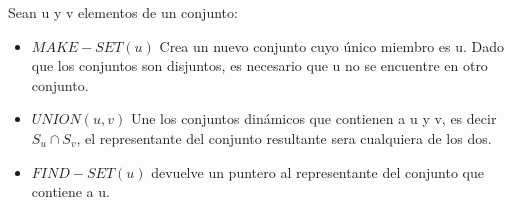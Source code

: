 \noindent Sean u y v elementos de un conjunto:
\begin{itemize}
    \item $MAKE-SET(u)$ Crea un nuevo conjunto cuyo único miembro es u. Dado que los conjuntos son disjuntos, es necesario que u no se encuentre en otro conjunto.
    \item $UNION(u, v)$ Une los conjuntos dinámicos que contienen a u y v, es decir $S_u \cap S_v$, el representante del conjunto resultante sera cualquiera de los dos.
    \item $FIND-SET(u)$ devuelve un puntero al representante del conjunto que contiene a u.
\end{itemize}

